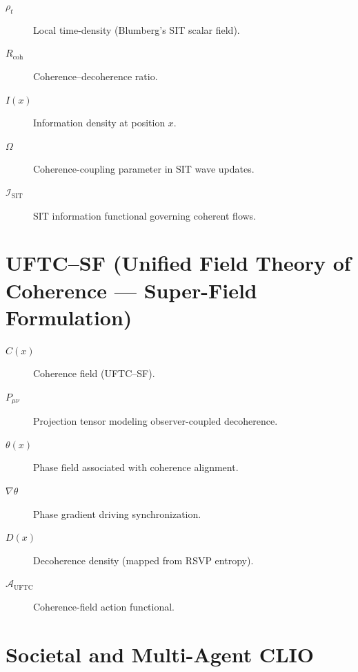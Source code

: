 \documentclass[12pt,oneside]{book}
\theoremstyle{plain}
\theoremstyle{definition}
\def\mathbb#1{#1}%
\begin{document}
\begin{description}

  \item[$\rho_t$] Local time-density (Blumberg's SIT scalar field).

  \item[$R_{\mathrm{coh}}$] Coherence–decoherence ratio.

  \item[$I(x)$] Information density at position $x$.

  \item[$\Omega$] Coherence-coupling parameter in SIT wave updates.

  \item[$\mathcal{I}_{\mathrm{SIT}}$] SIT information functional governing coherent flows.

\end{description}

\section{UFTC–SF (Unified Field Theory of Coherence — Super-Field Formulation)}

\begin{description}

  \item[$C(x)$] Coherence field (UFTC–SF).

  \item[$\mathbb{P}_{\mu\nu}$] Projection tensor modeling observer-coupled decoherence.

  \item[$\theta(x)$] Phase field associated with coherence alignment.

  \item[$\nabla \theta$] Phase gradient driving synchronization.

  \item[$D(x)$] Decoherence density (mapped from RSVP entropy).

  \item[$\mathcal{A}_{\mathrm{UFTC}}$] Coherence-field action functional.

\end{description}

\section{Societal and Multi-Agent CLIO}
\end{document}
